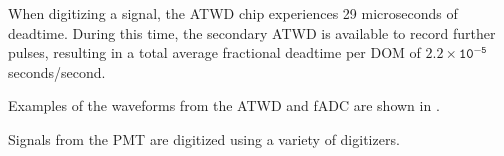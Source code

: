 When digitizing a signal, the ATWD chip experiences 29 microseconds of deadtime. 
During this time, the secondary ATWD is available to record further pulses, resulting in a total average fractional deadtime per DOM of $\mathtt{2.2 \times 10^{-5}}$ seconds/second.

Examples of the waveforms from the ATWD and fADC are shown in .



Signals from the PMT are digitized using a variety of digitizers.




